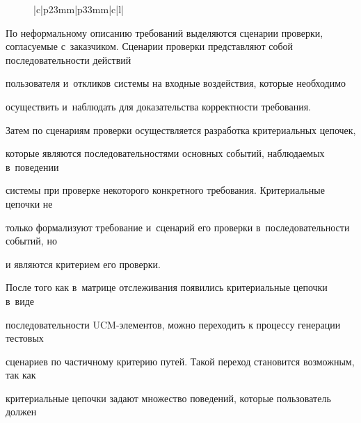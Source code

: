 \begin{figure}
\begin{center}
{\begin{tabular}{|c|p{23mm}|p{33mm}|c|l|}
\\

\hline

\end{tabular}


}

\end{center}

\vspace*{-9pt}

\end{figure}





  По неформальному описанию требований выделяются сценарии проверки, согласуемые с~заказчиком. Сценарии проверки представляют собой последовательности действий

пользователя и~откликов системы на входные воздействия, которые необходимо

осуществить и~наблюдать для доказательства корректности требования.



  Затем по сценариям проверки осуществляется разработка критериальных цепочек,

которые являются последовательностями основных событий, наблюдаемых в~поведении

системы при проверке некоторого конкретного требования. Критериальные цепочки не

только формализуют требование и~сценарий его проверки в~последовательности событий, но

и являются критерием его проверки.



  После того как в~матрице отслеживания появились критериальные цепочки в~виде

последовательности UCM-эле\-мен\-тов, можно переходить к процессу генерации тестовых

сценариев по частичному критерию путей. Такой переход становится возможным, так как

критериальные цепочки задают множество поведений, которые пользователь должен

